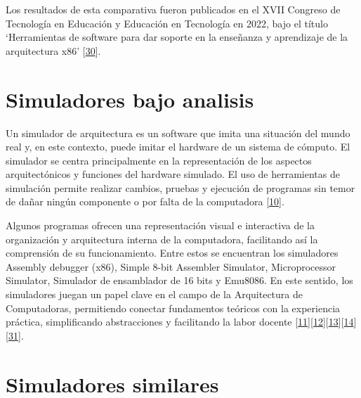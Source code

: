 \documentclass[12pt,twoside]{templates/unerthesis}
\begin{document}
Los resultados de esta comparativa fueron publicados en el XVII Congreso de Tecnología en Educación y Educación en Tecnología en 2022, bajo el título `Herramientas de software para dar soporte en la enseñanza y aprendizaje de la arquitectura x86' {[}\protect\hyperlink{ref-colombani_herramientas_2022}{30}{]}.

\hypertarget{simuladores-bajo-analisis}{%
\section{Simuladores bajo analisis}\label{simuladores-bajo-analisis}}

Un simulador de arquitectura es un software que imita una situación del mundo real y, en este contexto, puede imitar el hardware de un sistema de cómputo. El simulador se centra principalmente en la representación de los aspectos arquitectónicos y funciones del hardware simulado. El uso de herramientas de simulación permite realizar cambios, pruebas y ejecución de programas sin temor de dañar ningún componente o por falta de la computadora {[}\protect\hyperlink{ref-radivojevic_design_2011}{10}{]}.

Algunos programas ofrecen una representación visual e interactiva de la organización y arquitectura interna de la computadora, facilitando así la comprensión de su funcionamiento. Entre estos se encuentran los simuladores Assembly debugger (x86), Simple 8-bit Assembler Simulator, Microprocessor Simulator, Simulador de ensamblador de 16 bits y Emu8086. En este sentido, los simuladores juegan un papel clave en el campo de la Arquitectura de Computadoras, permitiendo conectar fundamentos teóricos con la experiencia práctica, simplificando abstracciones y facilitando la labor docente {[}\protect\hyperlink{ref-nikolic_survey_2009}{11}{]}{[}\protect\hyperlink{ref-hasan_survey_2012}{12}{]}{[}\protect\hyperlink{ref-hennessy_computer_2012}{13}{]}{[}\protect\hyperlink{ref-stallings_computer_2013}{14}{]}{[}\protect\hyperlink{ref-behrooz_computer_2005}{31}{]}.

\hypertarget{simuladores-similares}{%
\section{Simuladores similares}\label{simuladores-similares}}
\end{document}
